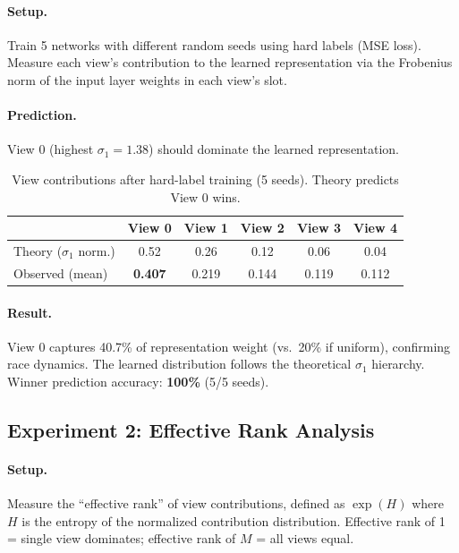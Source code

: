 \documentclass{article}
\begin{document}
\paragraph{Setup.} Train 5 networks with different random seeds using hard labels (MSE loss). Measure each view's contribution to the learned representation via the Frobenius norm of the input layer weights in each view's slot.

\paragraph{Prediction.} View 0 (highest $\sigma_1 = 1.38$) should dominate the learned representation.

\begin{table}[h]
\centering
\caption{View contributions after hard-label training (5 seeds). Theory predicts View 0 wins.}
\label{tab:coverage}
\begin{tabular}{@{}lccccc@{}}
\toprule
& View 0 & View 1 & View 2 & View 3 & View 4 \\
\midrule
Theory ($\sigma_1$ norm.) & 0.52 & 0.26 & 0.12 & 0.06 & 0.04 \\
Observed (mean) & \textbf{0.407} & 0.219 & 0.144 & 0.119 & 0.112 \\
\bottomrule
\end{tabular}
\end{table}

\paragraph{Result.} View 0 captures 40.7\% of representation weight (vs.\ 20\% if uniform), confirming race dynamics. The learned distribution follows the theoretical $\sigma_1$ hierarchy. Winner prediction accuracy: \textbf{100\%} (5/5 seeds).

\subsection{Experiment 2: Effective Rank Analysis}

\paragraph{Setup.} Measure the ``effective rank'' of view contributions, defined as $\exp(H)$ where $H$ is the entropy of the normalized contribution distribution. Effective rank of 1 = single view dominates; effective rank of $M$ = all views equal.
\end{document}
